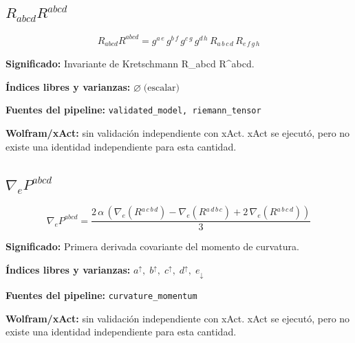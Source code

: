 \documentclass[11pt]{article}
\begin{document}
\subsection*{$ R_{abcd}R^{abcd} $}
\begin{dmath*}[breakdepth={5}]
R_{abcd}R^{abcd} = g{}^{a\,e}\,g{}^{b\,f}\,g{}^{c\,g}\,g{}^{d\,h}\,R{}_{a\,b\,c\,d}\,R{}_{e\,f\,g\,h}
\end{dmath*}
\par\vspace{1.2\baselineskip}\noindent
\begin{minipage}{\linewidth}
\textbf{Significado:} Invariante de Kretschmann R\_abcd R^abcd.\par
\textbf{Índices libres y varianzas:} $ \varnothing\;\text{(escalar)} $\par
\textbf{Fuentes del pipeline:} \texttt{validated\_model, riemann\_tensor}\par
\textbf{Wolfram/xAct:} sin validación independiente con xAct. xAct se ejecutó, pero no existe una identidad independiente para esta cantidad.\par
\end{minipage}
\subsection*{$ \nabla_e P^{abcd} $}
\begin{dmath*}[breakdepth={5}]
\nabla_e P^{abcd} = \frac{2\,\alpha\,\left(\nabla_{e}\!\left(R{}^{a\,c\,b\,d}\right) - \nabla_{e}\!\left(R{}^{a\,d\,b\,c}\right) + 2\,\nabla_{e}\!\left(R{}^{a\,b\,c\,d}\right)\right)}{3}
\end{dmath*}
\par\vspace{1.2\baselineskip}\noindent
\begin{minipage}{\linewidth}
\textbf{Significado:} Primera derivada covariante del momento de curvatura.\par
\textbf{Índices libres y varianzas:} $ a^{\uparrow},\;b^{\uparrow},\;c^{\uparrow},\;d^{\uparrow},\;e_{\downarrow} $\par
\textbf{Fuentes del pipeline:} \texttt{curvature\_momentum}\par
\textbf{Wolfram/xAct:} sin validación independiente con xAct. xAct se ejecutó, pero no existe una identidad independiente para esta cantidad.\par
\end{minipage}
\end{document}
